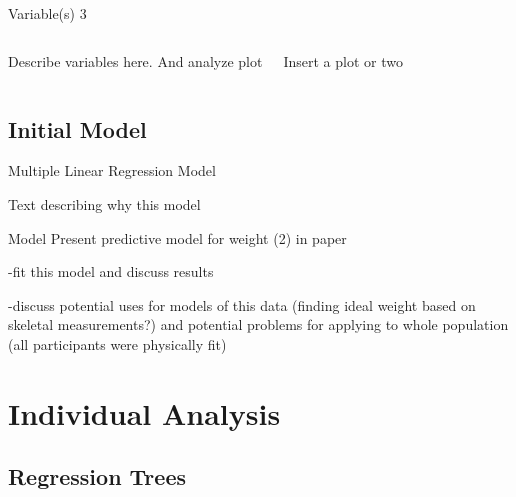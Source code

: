 \documentclass{beamer}\usepackage[]{graphicx}\usepackage[]{color}
\begin{document}

\begin{frame}{Variable(s) 3}
\begin{columns}[c] 

Describe variables here. And analyze plot

Insert a plot or two



\end{columns}
\end{frame}


\subsection{Initial Model}


\begin{frame}{Multiple Linear Regression Model}

Text describing why this model

\begin{block}{Model}
Present predictive model for weight (2) in paper

-fit this model and discuss results

-discuss potential uses for models of this data (finding ideal weight based on skeletal measurements?) and potential problems for applying to whole population (all participants were physically fit)
\end{block}


\end{frame}



\section{Individual Analysis}


\subsection{Regression Trees}

\end{document}
